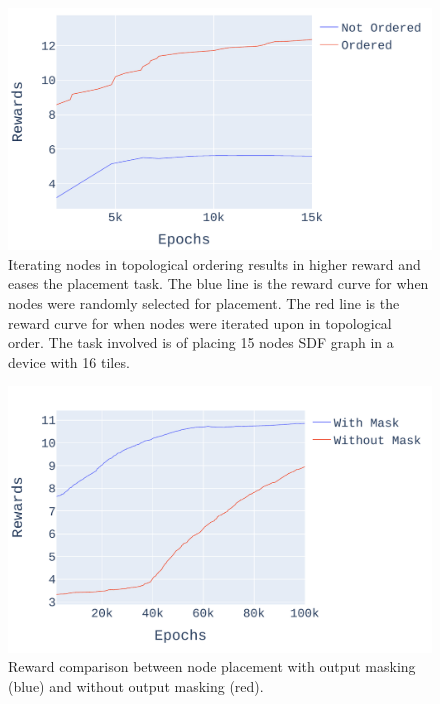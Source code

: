 \begin{figure}[tb]
  \centering
  \includegraphics[width=\linewidth]{fig/plot_ordered.pdf}
  \caption{Iterating nodes in topological ordering results in higher reward and eases the placement task. 
 The blue line is the reward curve for when nodes were randomly selected for placement. 
 The red line is the reward curve for when nodes were iterated upon in topological order. 
 The task involved is of placing 15 nodes SDF graph in a device with 16 tiles.}
  \label{fig:ordered_placement}
\end{figure}

\begin{figure}[tb]
  \centering
  \includegraphics[width=\linewidth]{fig/ifft_masked_nomask.pdf}
  \caption{Reward comparison between node placement with output masking (blue) and without output masking (red).}
  \label{fig:mask_nomask}
\end{figure}

